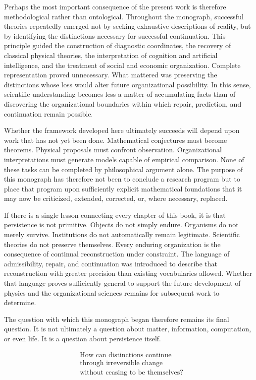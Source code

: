 \documentclass[11pt,oneside]{book}
\numberwithin{equation}{chapter}
\theoremstyle{definition}
\theoremstyle{plain}
\begin{document}
Perhaps the most important consequence of the present work is therefore
methodological rather than ontological. Throughout the monograph,
successful theories repeatedly emerged not by seeking exhaustive
descriptions of reality, but by identifying the distinctions necessary for
successful continuation. This principle guided the construction of
diagnostic coordinates, the recovery of classical physical theories, the
interpretation of cognition and artificial intelligence, and the treatment
of social and economic organization. Complete representation proved
unnecessary. What mattered was preserving the distinctions whose loss
would alter future organizational possibility. In this sense, scientific
understanding becomes less a matter of accumulating facts than of
discovering the organizational boundaries within which repair, prediction,
and continuation remain possible.

Whether the framework developed here ultimately succeeds will depend upon
work that has not yet been done. Mathematical conjectures must become
theorems. Physical proposals must confront observation. Organizational
interpretations must generate models capable of empirical comparison. None
of these tasks can be completed by philosophical argument alone. The
purpose of this monograph has therefore not been to conclude a research
program but to place that program upon sufficiently explicit mathematical
foundations that it may now be criticized, extended, corrected, or, where
necessary, replaced.

If there is a single lesson connecting every chapter of this book, it is
that persistence is not primitive. Objects do not simply endure. Organisms
do not merely survive. Institutions do not automatically remain
legitimate. Scientific theories do not preserve themselves. Every enduring
organization is the consequence of continual reconstruction under
constraint. The language of admissibility, repair, and continuation was
introduced to describe that reconstruction with greater precision than
existing vocabularies allowed. Whether that language proves sufficiently
general to support the future development of physics and the
organizational sciences remains for subsequent work to determine.

The question with which this monograph began therefore remains its final
question. It is not ultimately a question about matter, information,
computation, or even life. It is a question about persistence itself.

\[
\boxed{
\begin{aligned}
&\text{How can distinctions continue}\\
&\text{through irreversible change}\\
&\text{without ceasing to be themselves?}
\end{aligned}
}
\]
\end{document}
